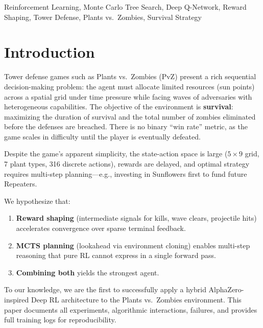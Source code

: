 \documentclass[conference]{IEEEtran}
\begin{document}
\begin{IEEEkeywords}
Reinforcement Learning, Monte Carlo Tree Search, Deep Q-Network, Reward Shaping, Tower Defense, Plants vs.\ Zombies, Survival Strategy
\end{IEEEkeywords}

\section{Introduction}

Tower defense games such as Plants vs.\ Zombies (PvZ) present a rich sequential decision-making problem: the agent must allocate limited resources (sun points) across a spatial grid under time pressure while facing waves of adversaries with heterogeneous capabilities. The objective of the environment is \textbf{survival}: maximizing the duration of survival and the total number of zombies eliminated before the defenses are breached. There is no binary ``win rate'' metric, as the game scales in difficulty until the player is eventually defeated.

Despite the game's apparent simplicity, the state-action space is large ($5 \times 9$ grid, 7 plant types, 316 discrete actions), rewards are delayed, and optimal strategy requires multi-step planning---e.g., investing in Sunflowers first to fund future Repeaters. 

We hypothesize that:
\begin{enumerate}[leftmargin=*]
    \item \textbf{Reward shaping} (intermediate signals for kills, wave clears, projectile hits) accelerates convergence over sparse terminal feedback.
    \item \textbf{MCTS planning} (lookahead via environment cloning) enables multi-step reasoning that pure RL cannot express in a single forward pass.
    \item \textbf{Combining both} yields the strongest agent.
\end{enumerate}

To our knowledge, we are the first to successfully apply a hybrid AlphaZero-inspired Deep RL architecture to the Plants vs.\ Zombies environment. This paper documents all experiments, algorithmic interactions, failures, and provides full training logs for reproducibility.

\end{document}
